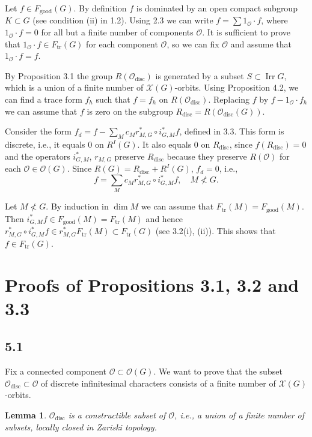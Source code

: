 \documentclass[12pt,a4paper]{article}
\theoremstyle{plain}
\newtheorem{lemma}{Lemma}
\theoremstyle{definition}
\theoremstyle{remark}
\DeclareMathOperator{\Irr}{Irr}
\DeclareMathOperator{\tr}{tr}
\DeclareMathOperator{\disc}{disc}
\newcommand{\cO}{\mathcal{O}}
\newcommand{\cX}{\mathcal{X}}
\begin{document}
Let $f \in F_{\text{good}}(G)$. By definition $f$ is dominated by an open compact subgroup $K \subset G$ (see condition (ii) in 1.2). Using 2.3 we can write $f = \sum 1_{\cO} \cdot f$, where $1_{\cO} \cdot f = 0$ for all but a finite number of components $\cO$. It is sufficient to prove that $1_{\cO} \cdot f \in F_{\tr}(G)$ for each component $\cO$, so we can fix $\cO$ and assume that $1_{\cO} \cdot f = f$.

By Proposition 3.1 the group $R(\cO_{\disc})$ is generated by a subset $S \subset \Irr G$, which is a union of a finite number of $\cX(G)$-orbits. Using Proposition 4.2, we can find a trace form $f_h$ such that $f = f_h$ on $R(\cO_{\disc})$. Replacing $f$ by $f - 1_{\cO} \cdot f_h$ we can assume that $f$ is zero on the subgroup $R_{\disc} = R(\cO_{\disc}(G))$.

Consider the form $f_d = f - \sum_M c_M r_{M,G}^* \circ i_{G,M}^* f$, defined in 3.3. This form is discrete, i.e., it equals 0 on $R^I(G)$. It also equals 0 on $R_{\disc}$, since $f(R_{\disc}) = 0$ and the operators $i_{G,M}^*$, $r_{M,G}$ preserve $R_{\disc}$ because they preserve $R(\cO)$ for each $\cO \in \cO(G)$. Since $R(G) = R_{\disc} + R^I(G)$, $f_d = 0$, i.e.,
\[
f = \sum_M c_M r_{M,G}^* \circ i_{G,M}^* f, \quad M \not< G.
\]

Let $M \not< G$. By induction in $\dim M$ we can assume that $F_{\tr}(M) = F_{\text{good}}(M)$. Then $i_{G,M}^* f \in F_{\text{good}}(M) = F_{\tr}(M)$ and hence $r_{M,G}^* \circ i_{G,M}^* f \in r_{M,G}^* F_{\tr}(M) \subset F_{\tr}(G)$ (see 3.2(i), (ii)). This shows that $f \in F_{\tr}(G)$.

\section*{Proofs of Propositions 3.1, 3.2 and 3.3}

\subsection*{5.1}

Fix a connected component $\cO \subset \cO(G)$. We want to prove that the subset $\cO_{\disc} \subset \cO$ of discrete infinitesimal characters consists of a finite number of $\cX(G)$-orbits.

\begin{lemma}
$\cO_{\disc}$ is a constructible subset of $\cO$, i.e., a union of a finite number of subsets, locally closed in Zariski topology.
\end{lemma}
\end{document}
